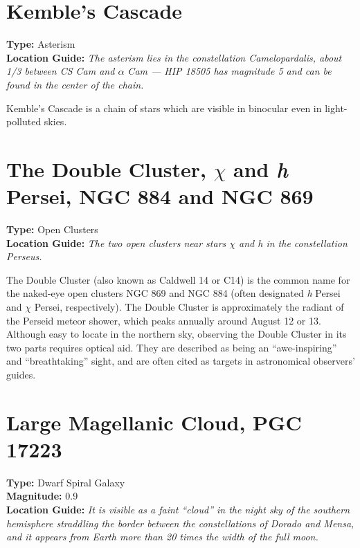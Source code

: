 \section{Kemble's Cascade}
\textbf{Type:} Asterism \\
\textbf{Location Guide:} \textit{The asterism lies in the
  constellation Camelopardalis, about 1/3 between CS Cam and $\alpha$
  Cam --- HIP 18505 has magnitude 5 and can be found in the center of the
  chain.}

Kemble's Cascade is a chain of stars which are visible in binocular even
in light-polluted skies.

\section{The Double Cluster, \texorpdfstring{$\chi$ and \emph{h}}{chi and h} Persei, NGC 884 and NGC 869}
\textbf{Type:} Open Clusters \\
\textbf{Location Guide:} \textit{The two open clusters near stars $\chi$ and h in the constellation Perseus.}

The Double Cluster (also known as Caldwell 14 or C14) is the common
name for the naked-eye open clusters NGC 869 and NGC 884 (often
designated \emph{h} Persei and $\chi$ Persei, respectively). The
Double Cluster is approximately the radiant of the Perseid meteor
shower, which peaks annually around August 12 or 13. Although easy to
locate in the northern sky, observing the Double Cluster in its two
parts requires optical aid. They are described as being an
``awe-inspiring'' and ``breathtaking'' sight, and are often cited as 
targets in astronomical observers' guides.


\section{Large Magellanic Cloud, PGC 17223}
\textbf{Type:} Dwarf Spiral Galaxy \\
\textbf{Magnitude:} 0.9 \\
\textbf{Location Guide:} \textit{It is visible as a faint ``cloud'' in
  the night sky of the southern hemisphere straddling the border
  between the constellations of Dorado and Mensa, and it appears from
  Earth more than 20 times the width of the full moon.}

